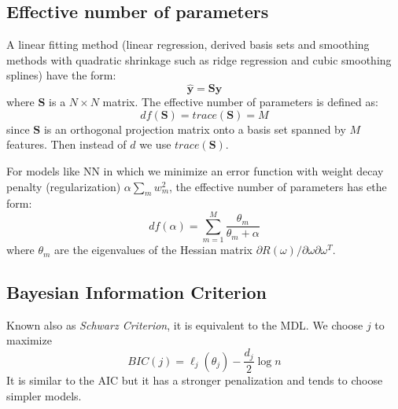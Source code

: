 \documentclass[12pt, letterpaper]{article}
\theoremstyle{definition}
\newcommand{\y}{\mathbf{y}}
\begin{document}
\subsection{Effective number of parameters}
A linear fitting method (linear regression, derived basis sets and smoothing methods with quadratic shrinkage such as ridge regression and cubic smoothing splines) have the form:
\begin{equation}
\hat{\y} = \mathbf{S}\y
\end{equation}
where $\mathbf{S}$ is a $N\times N$ matrix. The effective number of parameters is defined as:
\begin{equation}
df(\mathbf{S}) = trace(\mathbf{S}) = M
\end{equation}
since $\mathbf{S}$ is an orthogonal projection matrix onto a basis set spanned by $M$ features. Then instead of $d$ we use $trace(\mathbf{S})$.

For models like NN in which we minimize an error function with weight decay penalty (regularization) $\alpha \sum_m w_m^2$, the effective number of parameters has ethe form:
\begin{equation}
df(\alpha) = \sum_{m=1}^M \frac{\theta_m}{\theta_m+\alpha}
\end{equation}
where $\theta_m$ are the eigenvalues of the Hessian matrix $\partial R(\omega) /\partial \omega\partial \omega^T$.

\subsection{Bayesian Information Criterion}
Known also as \textit{Schwarz Criterion}, it is equivalent to the MDL. We choose $j$ to maximize
\begin{equation}
BIC(j) = \ell_j(\hat{\theta}_j) - \frac{d_j}{2}\log n
\end{equation}
It is similar to the AIC but it has a stronger penalization and tends to choose simpler models.
\end{document}
